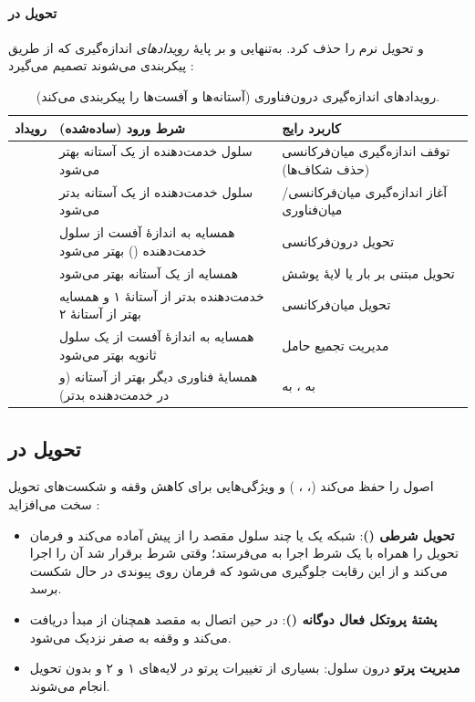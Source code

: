 \documentclass[11pt,a4paper]{article}
\begin{document}
\paragraph{تحویل در }   و تحویل نرم را حذف کرد.  به‌تنهایی و بر
پایهٔ \emph{رویدادهای} اندازه‌گیری که از طریق  پیکربندی می‌شوند تصمیم می‌گیرد \cite{ts36331}:
\begin{table}[htbp]
\centering\small
\caption{رویدادهای اندازه‌گیری درون‌فناوری  (آستانه‌ها و آفست‌ها را  پیکربندی می‌کند).}\label{tab:events}
\begin{tabularx}{\linewidth}{@{}l Y Y@{}}
\toprule
{}رویداد & شرط ورود (ساده‌شده) & کاربرد رایج \\
\midrule
{} & سلول خدمت‌دهنده از یک آستانه بهتر می‌شود & توقف اندازه‌گیری میان‌فرکانسی (حذف شکاف‌ها) \\
 & سلول خدمت‌دهنده از یک آستانه بدتر می‌شود & آغاز اندازه‌گیری میان‌فرکانسی/میان‌فناوری \\
 & همسایه به اندازهٔ آفست از سلول خدمت‌دهنده () بهتر می‌شود & تحویل درون‌فرکانسی \\
 & همسایه از یک آستانه بهتر می‌شود & تحویل مبتنی بر بار یا لایهٔ پوشش \\
 & خدمت‌دهنده بدتر از آستانهٔ ۱ و همسایه بهتر از آستانهٔ ۲ & تحویل میان‌فرکانسی \\
 & همسایه به اندازهٔ آفست از یک سلول ثانویه بهتر می‌شود & مدیریت تجمیع حامل \\
 & همسایهٔ فناوری دیگر بهتر از آستانه (و در  خدمت‌دهنده بدتر) &  به ،  به  \\
\bottomrule
\end{tabularx}
\end{table}

\subsection{تحویل در }
 اصول  را حفظ می‌کند (، ، ) و ویژگی‌هایی
برای کاهش وقفه و شکست‌های تحویل سخت می‌افزاید \cite{ts38300}:
\begin{itemize}
  \item \textbf{تحویل شرطی ()}: شبکه یک یا چند سلول مقصد را از پیش آماده می‌کند و فرمان تحویل
        را همراه با یک شرط اجرا به  می‌فرستد؛  وقتی شرط برقرار شد آن را اجرا می‌کند و
        از این رقابت جلوگیری می‌شود که فرمان روی پیوندی در حال شکست برسد.
  \item \textbf{پشتهٔ پروتکل فعال دوگانه ()}:  در حین اتصال به مقصد همچنان از مبدأ
        دریافت می‌کند و وقفه به صفر نزدیک می‌شود.
  \item \textbf{مدیریت پرتو} درون سلول: بسیاری از تغییرات پرتو در لایه‌های ۱ و ۲ و بدون تحویل
         انجام می‌شوند.
\end{itemize}
\end{document}

